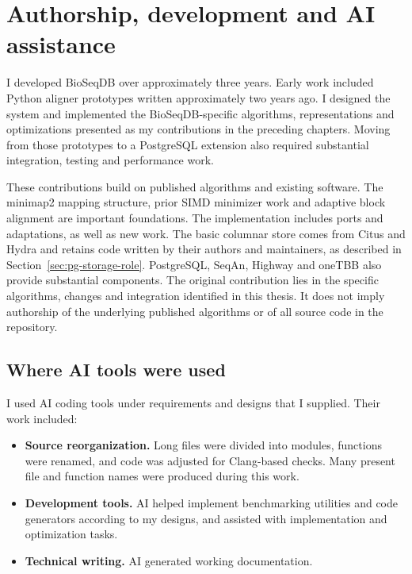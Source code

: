 \section{Authorship, development and AI assistance}
\label{sec:arch-authorship}

I developed BioSeqDB over approximately three years. Early work included
Python aligner prototypes written approximately two years ago. I
designed the system and implemented the BioSeqDB-specific algorithms,
representations and optimizations presented as my contributions in the
preceding chapters. Moving from those prototypes to a PostgreSQL extension
also required substantial integration, testing and performance work.

These contributions build on published algorithms and existing software.
The minimap2 mapping structure, prior SIMD minimizer work and adaptive block
alignment are important foundations.\autocite{minimap2_paper,
  groot_koerkamp_simd_minimizers_2025,block_aligner_paper}
The implementation includes ports and adaptations, as well as new work.
The basic columnar store comes from Citus and Hydra and retains code written
by their authors and maintainers, as described in
Section~\ref{sec:pg-storage-role}.\autocite{citus_columnar_storage,hydra_columnar_source}
PostgreSQL, SeqAn, Highway and oneTBB also provide substantial components.
The original contribution lies in the specific algorithms, changes and
integration identified in this thesis. It does not imply authorship of
the underlying published algorithms or of all source code in the repository.

\subsection{Where AI tools were used}
\label{sec:arch-ai-assistance}

I used AI coding tools under requirements and designs that I supplied.
Their work included:
\begin{itemize}
  \item \textbf{Source reorganization.} Long files were divided into modules,
    functions were renamed, and code was adjusted for Clang-based checks.
    Many present file and function names were produced during this work.
  \item \textbf{Development tools.} AI helped implement benchmarking utilities
    and code generators according to my designs, and assisted with
    implementation and optimization tasks.
  \item \textbf{Technical writing.} AI generated working documentation.
\end{itemize}

